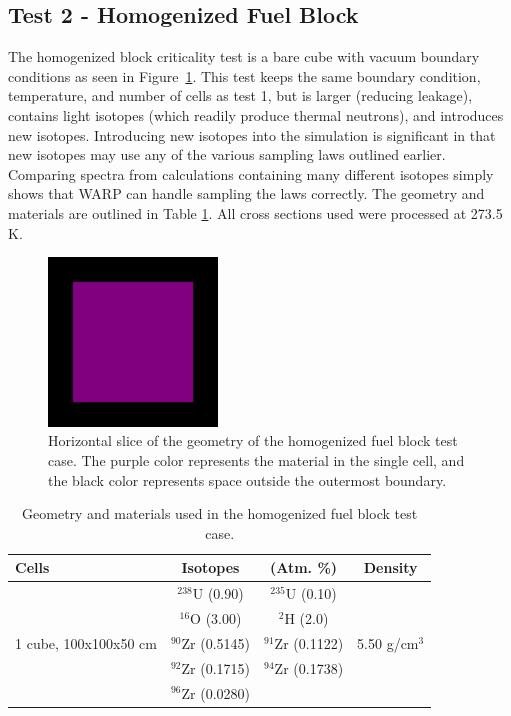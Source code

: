 \documentclass[preprint,12pt]{elsarticle}
\begin{document}
\newpage
\subsection{Test 2 - Homogenized Fuel Block}

The homogenized block criticality test is a bare cube with vacuum boundary conditions as seen in Figure~\ref{homfuel_geom_pic}.  This test keeps the same boundary condition, temperature, and number of cells as test 1, but is larger (reducing leakage), contains light isotopes (which readily produce thermal neutrons), and introduces new isotopes.  Introducing new isotopes into the simulation is significant in that new isotopes may use any of the various sampling laws outlined earlier.  Comparing spectra from calculations containing many different isotopes simply shows that WARP can handle sampling the laws correctly.  The geometry and materials are outlined in Table \ref{homfuel_geom}.  All cross sections used were processed at 273.5 K.

\begin{figure}[h!] 
  \centering
    \includegraphics[width=0.4\textwidth]{graphics/homfuel-xy.png}
     \caption{ Horizontal slice of the geometry of the homogenized fuel block test case.  The purple color represents the material in the single cell, and the black color represents space outside the outermost boundary. \label{homfuel_geom_pic} }
\end{figure}

\begin{table}[h]
\centering
\caption{Geometry and materials used in the homogenized fuel block test case.}
\label{homfuel_geom}
\begin{tabular}{| l | c  c | c |}
\hline
Cells & Isotopes & (Atm. \%)& Density \\
\hline
\multirow{5}{*}{1 cube, 100x100x50 cm }            &   $^{238}$U   (0.90)   &  $^{235}$U   (0.10)   &  \multirow{5}{*}{5.50 g/cm$^3$} \\
                                                   &   $^{16}$O    (3.00)   &  $^{2}$H     (2.0)    &  \\
                                                   &   $^{90}$Zr   (0.5145) &  $^{91}$Zr   (0.1122) &  \\
                                                   &   $^{92}$Zr   (0.1715) &  $^{94}$Zr   (0.1738) &  \\
                                                   &   $^{96}$Zr   (0.0280) &                       &  \\
\hline
\end{tabular}
\end{table}
\end{document}
